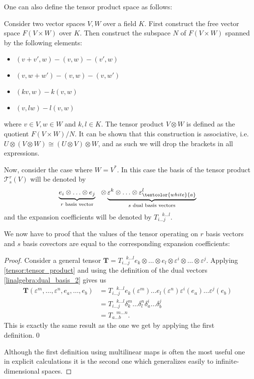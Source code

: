     One can also define the tensor product space as follows:
    \begin{adefinition}
        Consider two vector spaces $V, W$ over a field $K$. First construct the free vector space $F(V\times W)$ over $K$. Then construct the subspace $N$ of $F(V\times W)$ spanned by the following elements:
        \begin{itemize}
            \item $(v+v', w) - (v, w) - (v', w)$
            \item $(v, w+w') - (v, w) - (v, w')$
            \item $(kv, w) - k(v, w)$
            \item $(v, lw) - l(v, w)$
        \end{itemize}
        where $v\in V, w\in W$ and  $k,l\in K$. The tensor product $V\otimes W$ is defined as the quotient $F(V\times W)/N$. It can be shown that this construction is associative, i.e. $U\otimes(V\otimes W)\cong(U\otimes V)\otimes W$, and as such we will drop the brackets in all expressions.

        Now, consider the case where $W=V^*$. In this case the basis of the tensor product $\mathcal{T}^r_s(V)$ will be denoted by
        \[\underbrace{e_i\otimes\ldots\otimes e_j}_{r\text{ basis vector}}\ \ \otimes\underbrace{\varepsilon^k\otimes\ldots\otimes \varepsilon^l_{\textcolor{white}{a}}}_{s\text{ dual basis vectors}}\]
        and the expansion coefficients will be denoted by $T_{i\ldots j}^{\ \ \ \ k\ldots l}$.
    \end{adefinition}


    We now have to proof that the values of the tensor operating on $r$ basis vectors and $s$ basis covectors are equal to the corresponding expansion coefficients:
    \begin{proof}
        Consider a general tensor $\mathbf{T} = T_{i\ldots j}^{\ \ \ \ k\ldots l} e_k\otimes\ldots\otimes e_l\otimes\varepsilon^i\otimes\ldots\otimes\varepsilon^j$. Applying \ref{tensor:tensor_product} and using the definition of the dual vectors \ref{linalgebra:dual_basis_2} gives us
        \begin{align*}
            \mathbf{T}(\varepsilon^m, \ldots, \varepsilon^n, e_a, \ldots, e_b) &= T_{i\ldots j}^{\ \ \ \ k\ldots l}e_k(\varepsilon^m)\ldots e_l(\varepsilon^n)\varepsilon^i(e_a)\ldots\varepsilon^j(e_b)\\
            &= T_{i\ldots j}^{\ \ \ \ k\ldots l}\delta_k^m\ldots\delta_l^n\delta_a^i\ldots\delta_b^j\\
            &= T_{a\ldots b}^{\ \ \ \ m\ldots n}.
        \end{align*}
        This is exactly the same result as the one we get by applying the first definition.\qed

        Although the first definition using multilinear maps is often the most useful one in explicit calculations it is the second one which generalizes easily to infinite-dimensional spaces.
    \end{proof}

